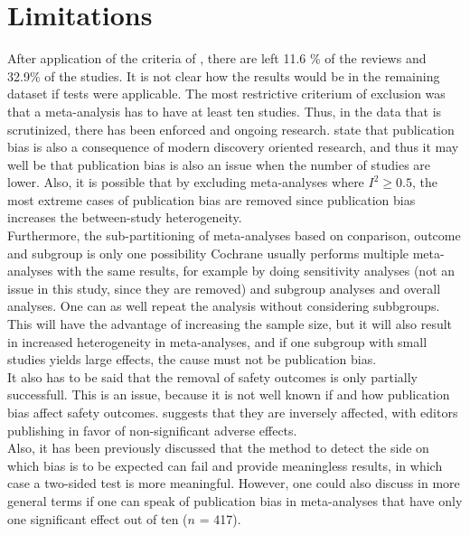 \documentclass[11pt,a4paper,twoside]{book}\usepackage[]{graphicx}\usepackage[]{color}
\begin{document}
\section{Limitations}
After application of the criteria of \citet{Ioannidis2007}, there are left 11.6 \% of the reviews and 32.9\% of the studies. It is not clear how the results would be in the remaining dataset if tests were applicable. The most restrictive criterium of exclusion was that a meta-analysis has to have at least ten studies. Thus, in the data that is scrutinized, there has been enforced and ongoing research. \citet{ioannidis.2005} state that publication bias is also a consequence of modern discovery oriented research, and thus it may well be that publication bias is also an issue when the number of studies are lower. Also, it is possible that by excluding meta-analyses where $I^2 \geq 0.5$, the most extreme cases of publication bias are removed since publication bias increases the between-study heterogeneity.\\
Furthermore, the sub-partitioning of meta-analyses based on conparison, outcome and subgroup is only one possibility%
Cochrane usually performs multiple meta-analyses with the same results, for example by doing sensitivity analyses (not an issue in this study, since they are removed) and subgroup analyses and overall analyses. One can as well repeat the analysis without considering subbgroups. This will have the advantage of increasing the sample size, but it will also result in increased heterogeneity in meta-analyses, and if one subgroup with small studies yields large effects, the cause must not be publication bias. \\
It also has to be said that the removal of safety outcomes is only partially successfull. This is an issue, because it is not well known if and how publication bias affect safety outcomes. \citet{kicinsky} suggests that they are inversely affected, with editors publishing in favor of non-significant adverse effects. \\
Also, it has been previously discussed that the method to detect the side on which bias is to be expected can fail and provide meaningless results, in which case a two-sided test is more meaningful. However, one could also discuss in more general terms if one can speak of publication bias in meta-analyses that have only one significant effect out of ten ($n$ = 417). \\
\end{document}

